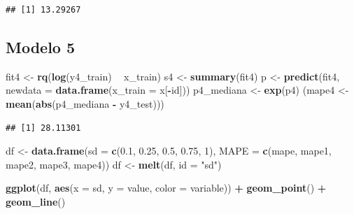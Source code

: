 \documentclass[]{article}
\newenvironment{Shaded}{\begin{snugshade}}{\end{snugshade}}
\newcommand{\KeywordTok}[1]{\textcolor[rgb]{0.13,0.29,0.53}{\textbf{#1}}}
\newcommand{\DataTypeTok}[1]{\textcolor[rgb]{0.13,0.29,0.53}{#1}}
\newcommand{\DecValTok}[1]{\textcolor[rgb]{0.00,0.00,0.81}{#1}}
\newcommand{\FloatTok}[1]{\textcolor[rgb]{0.00,0.00,0.81}{#1}}
\newcommand{\StringTok}[1]{\textcolor[rgb]{0.31,0.60,0.02}{#1}}
\newcommand{\OperatorTok}[1]{\textcolor[rgb]{0.81,0.36,0.00}{\textbf{#1}}}
\newcommand{\NormalTok}[1]{#1}
\begin{document}
\begin{verbatim}
## [1] 13.29267
\end{verbatim}

\subsection{Modelo 5}\label{modelo-5-1}

\begin{Shaded}
\begin{Highlighting}[]
\NormalTok{fit4 <-}\StringTok{ }\KeywordTok{rq}\NormalTok{(}\KeywordTok{log}\NormalTok{(y4_train) }\OperatorTok{~}\StringTok{ }\NormalTok{x_train)}
\NormalTok{s4 <-}\StringTok{ }\KeywordTok{summary}\NormalTok{(fit4)}
\NormalTok{p <-}\StringTok{ }\KeywordTok{predict}\NormalTok{(fit4, }\DataTypeTok{newdata =} \KeywordTok{data.frame}\NormalTok{(}\DataTypeTok{x_train =}\NormalTok{ x[}\OperatorTok{-}\NormalTok{id]))}
\NormalTok{p4_mediana <-}\StringTok{ }\KeywordTok{exp}\NormalTok{(p4)}
\NormalTok{(mape4 <-}\StringTok{ }\KeywordTok{mean}\NormalTok{(}\KeywordTok{abs}\NormalTok{(p4_mediana }\OperatorTok{-}\StringTok{ }\NormalTok{y4_test)))}
\end{Highlighting}
\end{Shaded}

\begin{verbatim}
## [1] 28.11301
\end{verbatim}

\begin{Shaded}
\begin{Highlighting}[]
\NormalTok{df <-}\StringTok{ }\KeywordTok{data.frame}\NormalTok{(}\DataTypeTok{sd =} \KeywordTok{c}\NormalTok{(}\FloatTok{0.1}\NormalTok{, }\FloatTok{0.25}\NormalTok{, }\FloatTok{0.5}\NormalTok{, }\FloatTok{0.75}\NormalTok{, }\DecValTok{1}\NormalTok{),}
                 \DataTypeTok{MAPE =} \KeywordTok{c}\NormalTok{(mape, mape1, mape2, mape3, mape4))}
\NormalTok{df <-}\StringTok{ }\KeywordTok{melt}\NormalTok{(df, }\DataTypeTok{id =} \StringTok{"sd"}\NormalTok{)}
\end{Highlighting}
\end{Shaded}

\begin{Shaded}
\begin{Highlighting}[]
\KeywordTok{ggplot}\NormalTok{(df, }\KeywordTok{aes}\NormalTok{(}\DataTypeTok{x =}\NormalTok{ sd, }\DataTypeTok{y =}\NormalTok{ value, }\DataTypeTok{color =}\NormalTok{ variable)) }\OperatorTok{+}\StringTok{ }
\StringTok{  }\KeywordTok{geom_point}\NormalTok{() }\OperatorTok{+}\StringTok{ }\KeywordTok{geom_line}\NormalTok{()}
\end{Highlighting}
\end{Shaded}
\end{document}

